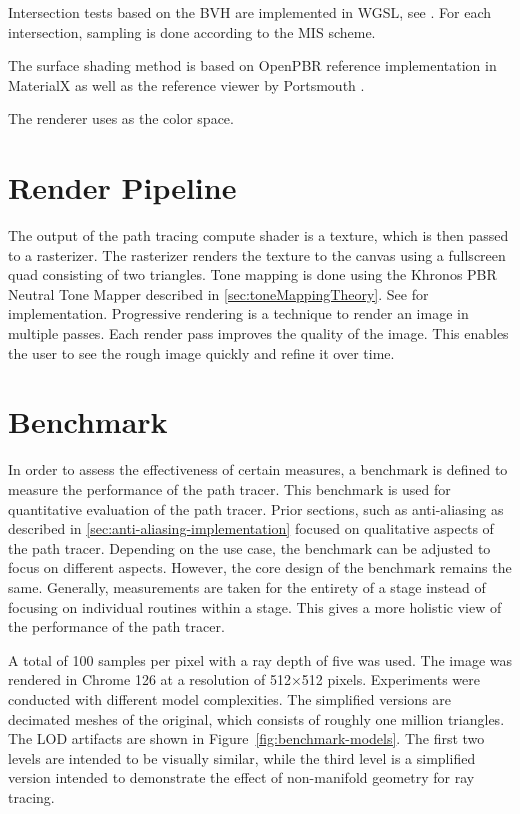 Intersection tests based on the \gls{BVH} are implemented in \gls{WGSL}, see . For each intersection, sampling is done according to the \gls{MIS} scheme.

The surface shading method is based on \gls{OpenPBR} reference implementation in \gls{MaterialX} as well as the reference viewer by Portsmouth \cite{openPbrViewer}.

The renderer uses  as the color space.

\section{Render Pipeline}

The output of the path tracing compute shader is a texture, which is then passed to a rasterizer. The rasterizer renders the texture to the canvas using a fullscreen quad consisting of two triangles. Tone mapping is done using the Khronos PBR Neutral Tone Mapper described in \autoref{sec:toneMappingTheory}. See  for implementation. Progressive rendering is a technique to render an image in multiple passes. Each render pass improves the quality of the image. This enables the user to see the rough image quickly and refine it over time. 

\section{Benchmark}
\label{sec:benchmark}

In order to assess the effectiveness of certain measures, a benchmark is defined to measure the performance of the path tracer. This benchmark is used for quantitative evaluation of the path tracer. Prior sections, such as anti-aliasing as described in \autoref{sec:anti-aliasing-implementation} focused on qualitative aspects of the path tracer. Depending on the use case, the benchmark can be adjusted to focus on different aspects. However, the core design of the benchmark remains the same. Generally, measurements are taken for the entirety of a stage instead of focusing on individual routines within a stage. This gives a more holistic view of the performance of the path tracer.

A total of 100 samples per pixel with a ray depth of five was used. The image was rendered in Chrome 126 at a resolution of 512$\times$512 pixels. Experiments were conducted with different model complexities. The simplified versions are decimated meshes of the original, which consists of roughly one million triangles. The LOD artifacts are shown in Figure~\ref{fig:benchmark-models}. The first two levels are intended to be visually similar, while the third level is a simplified version intended to demonstrate the effect of non-manifold geometry for ray tracing.


